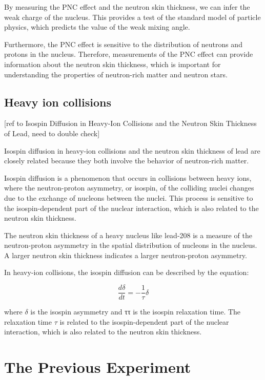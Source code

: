By measuring the PNC effect and the neutron skin thickness, we can infer the weak charge of the nucleus. This provides a test of the standard model of particle physics, which predicts the value of the weak mixing angle.

Furthermore, the PNC effect is sensitive to the distribution of neutrons and protons in the nucleus. Therefore, measurements of the PNC effect can provide information about the neutron skin thickness, which is important for understanding the properties of neutron-rich matter and neutron stars.

\subsection{Heavy ion collisions }
[ref to Isospin Diffusion in Heavy-Ion Collisions and the Neutron Skin Thickness of Lead, need to double check]

Isospin diffusion in heavy-ion collisions and the neutron skin thickness of lead are closely related because they both involve the behavior of neutron-rich matter.

Isospin diffusion is a phenomenon that occurs in collisions between heavy ions, where the neutron-proton asymmetry, or isospin, of the colliding nuclei changes due to the exchange of nucleons between the nuclei. This process is sensitive to the isospin-dependent part of the nuclear interaction, which is also related to the neutron skin thickness.

The neutron skin thickness of a heavy nucleus like lead-208 is a measure of the neutron-proton asymmetry in the spatial distribution of nucleons in the nucleus. A larger neutron skin thickness indicates a larger neutron-proton asymmetry.

In heavy-ion collisions, the isospin diffusion can be described by the equation:

\begin{equation}
    \frac{d\delta}{d t} = - \frac{1}{\tau}\delta
\end{equation}

where $\delta$ is the isospin asymmetry and ττ is the isospin relaxation time. The relaxation time $\tau$ is related to the isospin-dependent part of the nuclear interaction, which is also related to the neutron skin thickness.


\section{The Previous Experiment}


